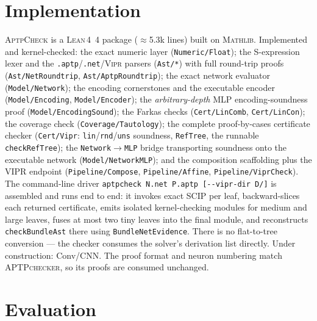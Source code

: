 \documentclass[runningheads]{llncs}
\newcommand{\vipr}{\textsc{Vipr}}
\newcommand{\scip}{\textsc{SCIP}}
\newcommand{\tool}{\textsc{AptpCheck}}
\newcommand{\pytool}{\textsc{APTPchecker}}
\newcommand{\lean}{\textsc{Lean\,4}}
\newcommand{\mathlib}{\textsc{Mathlib}}
\newcommand{\code}[1]{\texttt{#1}}
\begin{document}
\section{Implementation}\label{sec:implementation}

\tool{} is a \lean{}~4 package ($\approx$5.3k lines) built on \mathlib. Implemented and
kernel-checked: the exact numeric layer (\code{Numeric/Float}); the S-expression lexer
and the \code{.aptp}/\code{.net}/\vipr{} parsers (\code{Ast/*}) with full round-trip
proofs (\code{Ast/NetRoundtrip}, \code{Ast/AptpRoundtrip}); the exact network evaluator
(\code{Model/Network}); the encoding cornerstones and the executable encoder
(\code{Model/Encoding}, \code{Model/Encoder}); the \emph{arbitrary-depth} MLP
encoding-soundness proof (\code{Model/EncodingSound}); the Farkas checks
(\code{Cert/LinComb}, \code{Cert/LinCon}); the coverage check
(\code{Coverage/Tautology}); the complete proof-by-cases certificate checker
(\code{Cert/Vipr}: \code{lin}/\code{rnd}/\code{uns} soundness, \code{RefTree}, the
runnable \code{checkRefTree}); the \code{Network}$\to$\code{MLP} bridge transporting soundness onto the executable
network (\code{Model/NetworkMLP}); and the composition scaffolding plus the VIPR
endpoint (\code{Pipeline/Compose}, \code{Pipeline/Affine}, \code{Pipeline/ViprCheck}).
The command-line driver \code{aptpcheck N.net P.aptp [-{}-vipr-dir D/]} is assembled and
runs end to end: it invokes exact \scip{} per leaf, backward-slices each returned
certificate, emits isolated kernel-checking modules for medium and large leaves,
fuses at most two tiny leaves into the final module, and reconstructs
\code{checkBundleAst} there using \code{BundleNetEvidence}. There is no
flat-to-tree conversion --- the checker consumes the solver's derivation list directly.
Under construction: Conv/CNN. The proof format and neuron numbering match \pytool, so
its proofs are consumed unchanged.

\section{Evaluation}\label{sec:eval}
\end{document}
